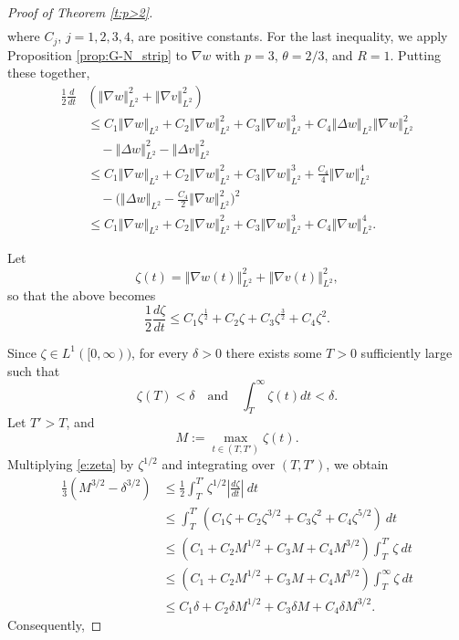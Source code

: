 \documentclass[final,11pt]{article}
\renewcommand{\leq}{\leqslant}
\theoremstyle{definition} %
\newcommand{\lv}{\left\Vert}
\newcommand{\rv}{\right\Vert}
\theoremstyle{plain}
\theoremstyle{definition} %
\theoremstyle{remark}
\begin{document}
\begin{proof}[Proof of Theorem \ref{t:p>2}]
\begin{align*}
\end{align*}
where $C_j$, $j=1,2,3,4$, are positive constants. For the last inequality,
we apply Proposition \ref{prop:G-N_strip} to $\nabla w $ with $p = 3$,  $\theta =2/3$, and $R=1$. Putting these together, 
\begin{align*}
\frac12\frac{d}{dt}&(\lv \nabla w \rv_{L^2}^2 + \lv \nabla v \rv_{L^2}^2) \\
&\leq C_1 \lv \nabla w \rv_{L^2} + C_2 \lv \nabla w \rv_{L^2}^2 + C_3\lv \nabla w \rv_{L^2}^3 +  C_4\lv \Delta w\rv_{L^2} \lv \nabla w \rv_{L^2}^2\\ 
& \quad -\lv \Delta w \rv_{L^2}^2  -\lv \Delta v \rv_{L^2}^2 \\
&\leq  C_1 \lv \nabla w \rv_{L^2} + C_2 \lv \nabla w \rv_{L^2}^2 + C_3\lv \nabla w \rv_{L^2}^3  + \frac{C_4}{4}\lv \nabla w \rv_{L^2}^4\\ 
&\quad -\Big(\lv \Delta w \rv_{L^2} -  \frac{C_4}{2} \lv \nabla w \rv_{L^2}^2\Big)^2\\
 &\leq  C_1 \lv \nabla w \rv_{L^2} + C_2 \lv \nabla w \rv_{L^2}^2 + C_3\lv \nabla w \rv_{L^2}^3 +C_4\lv \nabla w \rv_{L^2}^4. 
\end{align*}

Let 
\[
\zeta(t) = \lv \nabla w(t) \rv_{L^2}^2 + \lv \nabla v(t) \rv_{L^2}^2,
\]
so that the above becomes
\begin{equation}\label{e:zeta}
\frac12 \frac{d\zeta}{dt} \leq C_1 \zeta^\frac12 + C_2 \zeta + C_3\zeta^{\frac{3}{2}} + {C_4}\zeta^2.
\end{equation}

Since $\zeta \in L^1([0,\infty))$, for every $\delta > 0$ there exists some $T > 0$ sufficiently large such that 
\[
\zeta(T) < \delta \quad\text{and}\quad \int_T^\infty \zeta(t)dt < \delta.
\]
Let $T' > T$, and 
\[
M:= \max_{t \in (T,T')}\zeta(t).
\]
Multiplying \eqref{e:zeta} by $\zeta^{1/2}$ and integrating over $(T,T')$, we obtain
\begin{align*}
\frac{1}{3}(M^{3/2}-\delta^{3/2}) &\leq \frac12 \int_T^{T'}\zeta^{1/2} \left| \frac{d\zeta}{dt}\right|~dt \\
&\leq \int_T^{T'} (C_1 \zeta + C_2 \zeta^{3/2} + C_3\zeta^2 + {C_4}\zeta^{5/2})~dt\\
& \leq (C_1 + C_2M^{1/2} + C_3 M + {C_4} M^{3/2})\int_T^{T'}\zeta~dt\\
& \leq (C_1 + C_2M^{1/2} + C_3 M + {C_4} M^{3/2})\int_T^{\infty}\zeta~dt\\
&\leq C_1\delta + C_2\delta M^{1/2} + C_3\delta M + {C_4}\delta M^{3/2}.
\end{align*}
Consequently, 


\end{proof}
\end{document}
